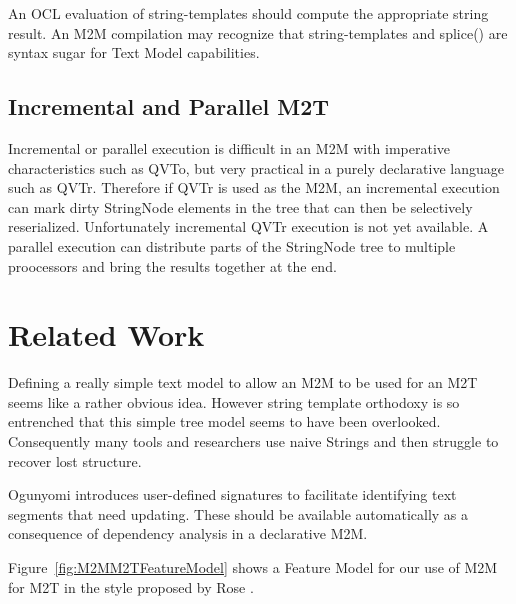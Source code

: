\documentclass{llncs}
\begin{document}
An OCL evaluation of string-templates should compute the appropriate string result. An M2M compilation may recognize that string-templates and splice() are syntax sugar for Text Model capabilities.



\subsection{Incremental and Parallel M2T}\label{Incremental M2T}

Incremental or parallel execution is difficult in an M2M with imperative characteristics such as QVTo, but very practical in a purely declarative language such as QVTr. Therefore if QVTr is used as the M2M, an incremental execution can mark dirty StringNode elements in the tree that can then be selectively reserialized. Unfortunately incremental QVTr execution is not yet available. A parallel execution can distribute parts of the StringNode tree to multiple proocessors and bring the results together at the end.

\section{Related Work}\label{Related Work}

Defining a really simple text model to allow an M2M to be used for an M2T seems like a rather obvious idea. However string template orthodoxy is so entrenched that this simple tree model seems to have been overlooked. Consequently many tools and researchers use naive Strings and then struggle to recover lost structure.

Ogunyomi \cite{Signatures} introduces user-defined signatures to facilitate identifying text segments that need updating. These should be available automatically as a consequence of dependency analysis in a declarative M2M. 

Figure~\ref{fig:M2MM2TFeatureModel} shows a Feature Model for our use of M2M for M2T in the style proposed by Rose \cite{Feature Model}. 
\end{document}
